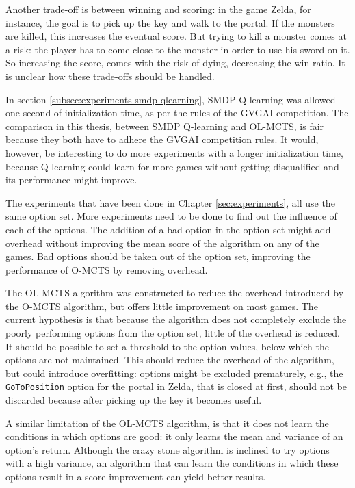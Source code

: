 Another trade-off is between winning and scoring: in the game Zelda, for
instance, the goal is to pick up the key and walk to the portal. If the monsters
are killed, this increases the eventual score. But trying to kill a monster
comes at a risk: the player has to come close to the monster in order to use his
sword on it. So increasing the score, comes with the risk of dying, decreasing
the win ratio. It is unclear how these trade-offs should be handled.

In section \ref{subsec:experiments-smdp-qlearning}, SMDP Q-learning was allowed
one second of initialization time, as per the rules of the GVGAI competition.
The comparison in this thesis, between SMDP Q-learning and OL-MCTS, is fair
because they both have to adhere the GVGAI competition rules. It would, however,
be interesting to do more experiments with a longer initialization time, because
Q-learning could learn for more games without getting disqualified and its
performance might improve.

The experiments that have been done in Chapter \ref{sec:experiments}, all use
the same option set. More experiments need to be done to find out the influence
of each of the options. The addition of a bad option in the option set might add
overhead without improving the mean score of the algorithm on any of the games.
Bad options should be taken out of the option set, improving the performance of
O-MCTS by removing overhead. 

The OL-MCTS algorithm was constructed to reduce the overhead introduced by the
O-MCTS algorithm, but offers little improvement on most games. The current
hypothesis is that because the algorithm does not completely exclude the poorly
performing options from the option set, little of the overhead is reduced. It
should be possible to set a threshold to the option values, below which the
options are not maintained. This should reduce the overhead of the algorithm,
but could introduce overfitting: options might be excluded prematurely, e.g.,
the \texttt{GoToPosition} option for the portal in Zelda, that is closed at
first, should not be discarded because after picking up the key it becomes
useful. 

A similar limitation of the OL-MCTS algorithm, is that it does not learn the
conditions in which options are good: it only learns the mean and variance of an
option's return. Although the crazy stone algorithm is inclined to try options
with a high variance, an algorithm that can learn the conditions in which these
options result in a score improvement can yield better results.

